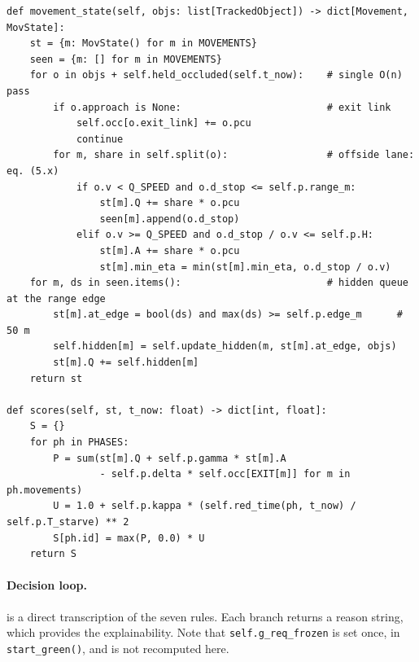 \begin{lstlisting}[style=py,caption={Movement pressure and phase score (\texttt{control/prism.py})},label={lst:impl-pressure}]
def movement_state(self, objs: list[TrackedObject]) -> dict[Movement, MovState]:
    st = {m: MovState() for m in MOVEMENTS}
    seen = {m: [] for m in MOVEMENTS}
    for o in objs + self.held_occluded(self.t_now):    # single O(n) pass
        if o.approach is None:                         # exit link
            self.occ[o.exit_link] += o.pcu
            continue
        for m, share in self.split(o):                 # offside lane: eq. (5.x)
            if o.v < Q_SPEED and o.d_stop <= self.p.range_m:
                st[m].Q += share * o.pcu
                seen[m].append(o.d_stop)
            elif o.v >= Q_SPEED and o.d_stop / o.v <= self.p.H:
                st[m].A += share * o.pcu
                st[m].min_eta = min(st[m].min_eta, o.d_stop / o.v)
    for m, ds in seen.items():                         # hidden queue at the range edge
        st[m].at_edge = bool(ds) and max(ds) >= self.p.edge_m      # 50 m
        self.hidden[m] = self.update_hidden(m, st[m].at_edge, objs)
        st[m].Q += self.hidden[m]
    return st

def scores(self, st, t_now: float) -> dict[int, float]:
    S = {}
    for ph in PHASES:
        P = sum(st[m].Q + self.p.gamma * st[m].A
                - self.p.delta * self.occ[EXIT[m]] for m in ph.movements)
        U = 1.0 + self.p.kappa * (self.red_time(ph, t_now) / self.p.T_starve) ** 2
        S[ph.id] = max(P, 0.0) * U
    return S
\end{lstlisting}

\paragraph{Decision loop.}  is a direct transcription of the seven rules. Each branch returns a reason string, which provides the explainability. Note that \texttt{self.g\_req\_frozen} is set once, in \texttt{start\_green()}, and is not recomputed here.

